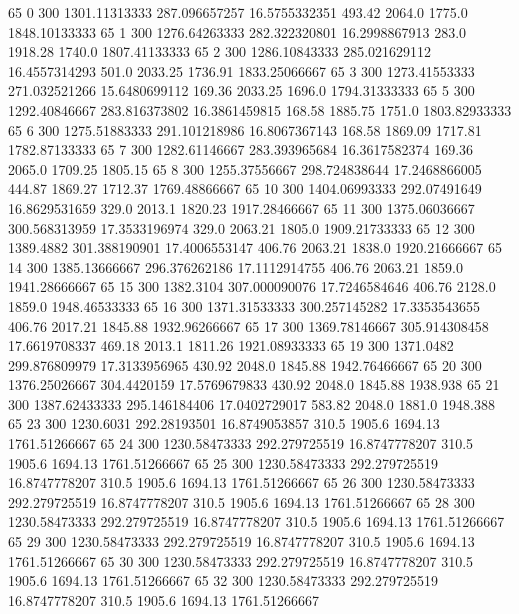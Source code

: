 65  0  300  1301.11313333  287.096657257  16.5755332351  493.42  2064.0  1775.0  1848.10133333 
65  1  300  1276.64263333  282.322320801  16.2998867913  283.0  1918.28  1740.0  1807.41133333 
65  2  300  1286.10843333  285.021629112  16.4557314293  501.0  2033.25  1736.91  1833.25066667 
65  3  300  1273.41553333  271.032521266  15.6480699112  169.36  2033.25  1696.0  1794.31333333 
65  5  300  1292.40846667  283.816373802  16.3861459815  168.58  1885.75  1751.0  1803.82933333 
65  6  300  1275.51883333  291.101218986  16.8067367143  168.58  1869.09  1717.81  1782.87133333 
65  7  300  1282.61146667  283.393965684  16.3617582374  169.36  2065.0  1709.25  1805.15 
65  8  300  1255.37556667  298.724838644  17.2468866005  444.87  1869.27  1712.37  1769.48866667 
65  10  300  1404.06993333  292.07491649  16.8629531659  329.0  2013.1  1820.23  1917.28466667 
65  11  300  1375.06036667  300.568313959  17.3533196974  329.0  2063.21  1805.0  1909.21733333 
65  12  300  1389.4882  301.388190901  17.4006553147  406.76  2063.21  1838.0  1920.21666667 
65  14  300  1385.13666667  296.376262186  17.1112914755  406.76  2063.21  1859.0  1941.28666667 
65  15  300  1382.3104  307.000090076  17.7246584646  406.76  2128.0  1859.0  1948.46533333 
65  16  300  1371.31533333  300.257145282  17.3353543655  406.76  2017.21  1845.88  1932.96266667 
65  17  300  1369.78146667  305.914308458  17.6619708337  469.18  2013.1  1811.26  1921.08933333 
65  19  300  1371.0482  299.876809979  17.3133956965  430.92  2048.0  1845.88  1942.76466667 
65  20  300  1376.25026667  304.4420159  17.5769679833  430.92  2048.0  1845.88  1938.938 
65  21  300  1387.62433333  295.146184406  17.0402729017  583.82  2048.0  1881.0  1948.388 
65  23  300  1230.6031  292.28193501  16.8749053857  310.5  1905.6  1694.13  1761.51266667 
65  24  300  1230.58473333  292.279725519  16.8747778207  310.5  1905.6  1694.13  1761.51266667 
65  25  300  1230.58473333  292.279725519  16.8747778207  310.5  1905.6  1694.13  1761.51266667 
65  26  300  1230.58473333  292.279725519  16.8747778207  310.5  1905.6  1694.13  1761.51266667 
65  28  300  1230.58473333  292.279725519  16.8747778207  310.5  1905.6  1694.13  1761.51266667 
65  29  300  1230.58473333  292.279725519  16.8747778207  310.5  1905.6  1694.13  1761.51266667 
65  30  300  1230.58473333  292.279725519  16.8747778207  310.5  1905.6  1694.13  1761.51266667 
65  32  300  1230.58473333  292.279725519  16.8747778207  310.5  1905.6  1694.13  1761.51266667 

